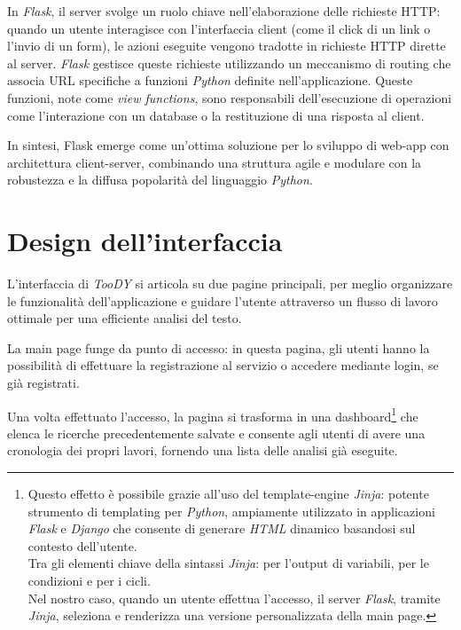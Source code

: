 \documentclass[12pt]{report}
\newcommand{\toody}{\textsl{TooDY}\xspace}
\newcommand{\python}{\textsl{Python}\xspace}
\newcommand{\jinja}{\textsl{Jinja}\xspace}
\newcommand{\flask}{\textsl{Flask}\xspace}
\newcommand{\django}{\textsl{Django}\xspace}
\newcommand{\html}{\textsl{HTML}\xspace}
\newcommand{\URL}{\textsf{URL}\xspace}
\newcommand{\http}{\textsf{HTTP}\xspace}
\begin{document}
In \flask, il server svolge un ruolo chiave nell'elaborazione delle richieste \http: quando un utente interagisce con l'interfaccia client (come il click di un link o l'invio di un form), le azioni eseguite vengono tradotte in richieste \http dirette al server. \flask gestisce queste richieste utilizzando un meccanismo di routing che associa \URL specifiche a funzioni \python definite nell'applicazione. Queste funzioni, note come \textit{view functions}, sono responsabili dell'esecuzione di operazioni come l'interazione con un database o la restituzione di una risposta al client.

In sintesi, Flask emerge come un'ottima soluzione per lo sviluppo di web-app con architettura client-server, combinando una struttura agile e modulare con la robustezza e la diffusa popolarità del linguaggio \python.


\section{Design dell'interfaccia}
L'interfaccia di \toody si articola su due pagine principali, per meglio organizzare le funzionalità dell'applicazione e guidare l'utente attraverso un flusso di lavoro ottimale per una efficiente analisi del testo.

La \textsf{main page} funge da punto di accesso: in questa pagina, gli utenti hanno la possibilità di effettuare la registrazione al servizio o accedere mediante login, se già registrati.

Una volta effettuato l'accesso, la pagina si trasforma in una dashboard\footnote{Questo effetto è possibile grazie all'uso del template-engine \jinja: potente strumento di templating per \python, ampiamente utilizzato in applicazioni \flask e \django che consente di generare \html dinamico basandosi sul contesto dell'utente.\\
Tra gli elementi chiave della sintassi \jinja: \texttt{\string{\string{ \string}\string}} per l'output di variabili, \texttt{} per le condizioni e \texttt{} per i cicli.\\
Nel nostro caso, quando un utente effettua l'accesso, il server \flask, tramite \jinja, seleziona e renderizza una versione personalizzata della main page.} che elenca le ricerche precedentemente salvate e consente agli utenti di avere una cronologia dei propri lavori, fornendo una lista delle analisi già eseguite.
\end{document}

